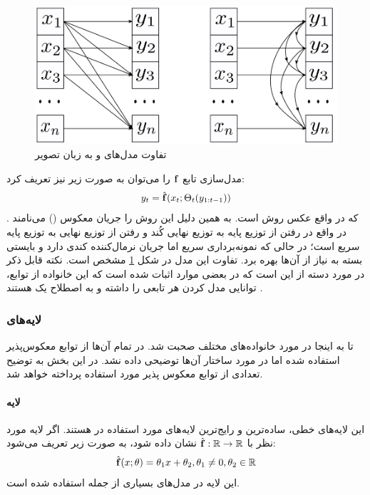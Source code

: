 \begin{figure}[h]
    \centering
    \includegraphics[width=.5\textwidth]{images/flow-survey2.png}
    \caption{
        تفاوت مدل‌های  و  به زبان تصویر \cite{iaf, maf, flow_survey}
    }
    \label{fig:chap2:mafvsiaf}
\end{figure}

مدل‌سازی تابع \autoregressive{}
${\bf f}$
را می‌توان به صورت زیر نیز تعریف کرد:
\begin{align}
y_t = \hat{{\bf f}}(x_t; \Theta_t(y_{1:t-1}))
\end{align}
که در واقع عکس روش  است. به همین دلیل این روش را جریان \autoregressive{} معکوس ()
می‌نامند \cite{iaf, flow_survey}. در واقع در  رفتن از توزیع پایه به توزیع نهایی کُند و رفتن از توزیع نهایی به توزیع پایه سریع است؛ در حالی که  نمونه‌برداری سریع اما جریان نرمال‌کننده کندی دارد و بایستی بسته به نیاز از آن‌ها بهره برد. تفاوت این مدل در شکل \ref{fig:chap2:mafvsiaf} مشخص است.
نکته قابل ذکر در مورد دسته \autoregressive{}  از \normalizingflownets{} این است که در  بعضی موارد اثبات شده است که این خانواده از توابع، توانایی مدل کردن هر تابعی را داشته و به اصطلاح یک
هستند \cite{flow_survey}.
\subsubsection{لایه‌های \coupling{}}
تا به اینجا در مورد خانواده‌های مختلف \normalizingflownets{} صحبت شد. در تمام آن‌ها از توابع معکوس‌پذیر استفاده شده اما در مورد ساختار آن‌ها توضیحی داده نشد. در این بخش به توضیح تعدادی از توابع معکوس پذیر مورد استفاده پرداخته خواهد شد.
\paragraph*{لایه
    \coupling{} }
این لایه‌های خطی، ساده‌ترین و رایج‌ترین لایه‌های مورد استفاده در \normalizingflownets{} هستند. اگر لایه مورد نظر با $\hat{{\bf f}}: {\mathbb{R}} \rightarrow {\mathbb{R}}$ نشان داده شود، به صورت زیر تعریف می‌شود:
\begin{align}
\hat{{\bf f}} (x; \theta) = \theta_1 x + \theta_2, \theta_1 \neq 0, \theta_2 \in {\mathbb{R}}
\end{align}
این لایه در مدل‌های بسیاری از جمله \cite{iaf, maf} استفاده شده است.
